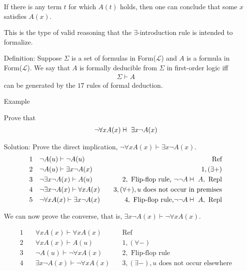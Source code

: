 \documentclass{article}
\newcommand{\vdashv}{%
    \mathrel{%
        \text{%
            \ooalign{$\vdash$ \cr $\dashv$ \cr}%
        }
    }
}
\begin{document}
If there is any term $t$ for which $A(t)$ holds, then one can conclude that some $x$ satisfies $A(x)$.

This is the type of valid reasoning that the $\exists$-introduction rule is intended to formalize.

Definition: Suppose $\Sigma$ is a set of formulas in Form($\mathcal{L}$) and $A$ is a formula in Form($\mathcal{L}$). We say that $A$ is formally deducible from $\Sigma$ in first-order logic iff
\begin{align*}
\Sigma \vdash A
\end{align*}
can be generated by the $17$ rules of formal deduction.

Example

Prove that
\begin{align*}
\neg \forall x A(x) \vdashv \exists x \neg A(x)
\end{align*}

Solution: Prove the direct implication, $\neg \forall x A(x) \vdash \exists x \neg A(x)$.
\begin{align*}
1 \quad &\neg A(u) \vdash \neg A(u) \quad &\text{Ref}\\
2 \quad &\neg A(u) \vdash \exists x \neg A(x)  \quad &1, (\exists +)\\
3 \quad &\neg \exists x \neg A(x) \vdash A(u)  \quad &2, \text{ Flip-flop rule, } \neg \neg A \vdashv A, \text{ Repl} \\
4 \quad &\neg \exists x \neg A(x) \vdash \forall x A(x)  \quad &3, (\forall +), u \text{ does not occur in premises}\\
5 \quad &\neg \forall x A(x) \vdash \exists x \neg A(x) \quad &4, \text{ Flip-flop rule,} \neg \neg A \vdashv A, \text{ Repl}
\end{align*}

We can now prove the converse, that is, $\exists x \neg A(x) \vdash \neg \forall x A(x)$.

\begin{align*}
1 \quad &\forall x A(x) \vdash \forall x A(x) \quad &\text{Ref}\\
2 \quad &\forall x A(x) \vdash A(u)  \quad &1, (\forall -)\\
3 \quad &\neg A(u) \vdash \neg \forall x A(x)  \quad &2, \text{ Flip-flop rule}\\
4 \quad &\exists x \neg A(x) \vdash \neg \forall x A(x)  \quad &3, (\exists -), u \text{ does not occur elsewhere}\\
\end{align*}
\end{document}

